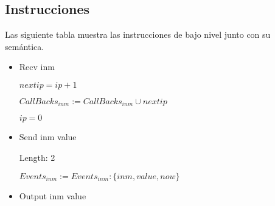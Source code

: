 \subsection{Instrucciones}

Las siguiente tabla muestra las instrucciones de bajo nivel junto con su semántica.

\begin{itemize}
\item Recv inm

 $nextip = ip + 1$

 $CallBacks_{inm} := CallBacks_{inm} \cup nextip$
 
 $ip = 0$

\item Send inm value

 Length: 2

 $Events_{inm} := Events_{inm} : \{inm, value, now\}$

\item Output inm value
\end{itemize}
